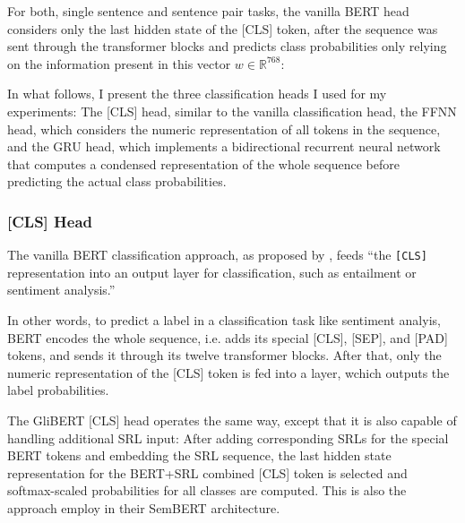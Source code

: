 For both, single sentence and sentence pair tasks, the vanilla BERT head considers
only the last hidden state of the [CLS] token, after the sequence was sent through
the transformer blocks and predicts class probabilities only relying on the
information present in this vector $w \in \mathbb{R}^{768}$:

In what follows, I present the three classification heads I used for my experiments: The
[CLS] head, similar to the vanilla classification head, the FFNN head, which considers the
numeric representation of all tokens in the sequence, and the GRU head, which implements
a bidirectional recurrent neural network that computes a condensed representation of the
whole sequence before predicting the actual class probabilities.



\subsubsection{[CLS] Head}

The vanilla BERT classification approach, as proposed by \cite{devlin2018bert}, feeds
``the \texttt{[CLS]} representation \textelp{} into an output layer for classification,
such as entailment or sentiment analysis.''

In other words, to predict a label in a classification task like sentiment analyis, BERT
encodes the whole sequence, i.e. adds its special [CLS], [SEP], and [PAD] tokens, and
sends it through its twelve transformer blocks. After that, only the numeric representation
of the [CLS] token is fed into a layer, wchich outputs the label probabilities.

The GliBERT [CLS] head operates the same way, except that it is also capable of
handling additional SRL input: After adding corresponding SRLs for the special BERT
tokens and embedding the SRL sequence, the last hidden state representation for the
BERT+SRL combined [CLS] token is selected and softmax-scaled probabilities for all
classes are computed. This is also the approach \cite{zhang2019semantics} employ in
their SemBERT architecture.


